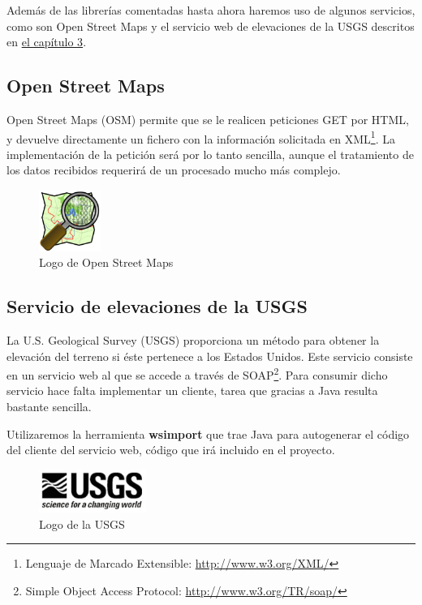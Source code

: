 Además de las librerías comentadas hasta ahora haremos uso de algunos
servicios, como son Open Street Maps y el servicio web de elevaciones de la
USGS descritos en \hyperref[cap3]{el capítulo 3}.

\subsection*{Open Street Maps}

Open Street Maps (OSM)\cite{Pinto09} permite que se le realicen peticiones GET
por HTML, y
devuelve directamente un fichero con la información solicitada en
XML\footnote{Lenguaje de Marcado Extensible: \url{http://www.w3.org/XML/}}. La
implementación de la petición será por lo tanto sencilla, aunque el tratamiento
de los datos recibidos requerirá de un procesado mucho más complejo.

\begin{figure}[H]
 \centering
 \includegraphics[width=20mm]{figuras/cap4/osm.png}
 \caption{Logo de Open Street Maps}
\end{figure}

\subsection*{Servicio de elevaciones de la USGS}

La U.S. Geological Survey (USGS) proporciona un método para obtener la elevación
del terreno si éste pertenece a los Estados Unidos. Este servicio consiste en un
servicio web al que se accede a través de SOAP\footnote{Simple Object Access
Protocol: \url{http://www.w3.org/TR/soap/}}. Para consumir dicho servicio hace
falta implementar un cliente, tarea que gracias a Java resulta bastante
sencilla.

Utilizaremos la herramienta {\bf wsimport} que trae Java para autogenerar el
código del cliente del servicio web, código que irá incluido en el proyecto.

\begin{figure}[H]
 \centering
 \includegraphics[width=35mm]{figuras/cap4/usgs.png}
 \caption{Logo de la USGS}
\end{figure}

